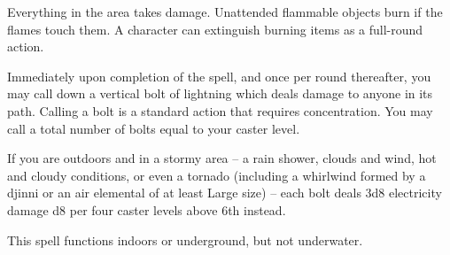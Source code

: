 \begin{spelleffect}
  Everything in the area takes damage. Unattended flammable objects burn if the flames touch them. A character can extinguish burning items as a full-round action.
\end{spelleffect}

\begin{comment}
\subsubsection{C}
\end{comment}

\spellrng{\rngmed}
\begin{spelleffect}
  Immediately upon completion of the spell, and once per round thereafter, you may call down a vertical bolt of lightning which deals damage to anyone in its path. Calling a bolt is a standard action that requires concentration. You may call a total number of bolts equal to your caster level.
  \par If you are outdoors and in a stormy area -- a rain shower, clouds and wind, hot and cloudy conditions, or even a tornado (including a whirlwind formed by a djinni or an air elemental of at least Large size) -- each bolt deals 3d8 electricity damage \add d8 per four caster levels above 6th instead.
\end{spelleffect}
\begin{spellnotes}
  This spell functions indoors or underground, but not underwater.
\end{spellnotes}

